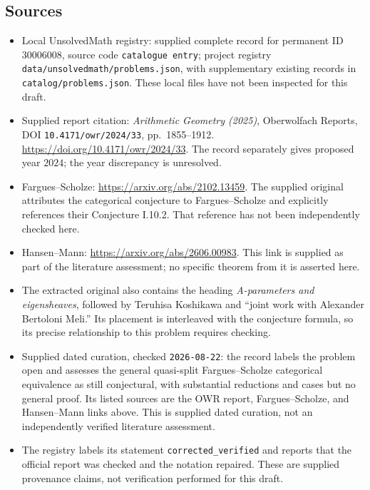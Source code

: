 \documentclass[11pt]{article}
\begin{document}
\subsection{Sources}
\begin{itemize}
\item Local UnsolvedMath registry: supplied complete record for permanent ID \(30006008\), source code \texttt{catalogue entry}; project registry \texttt{data/unsolvedmath/problems.json}, with supplementary existing records in \texttt{catalog/problems.json}. These local files have not been inspected for this draft.
\item Supplied report citation: \emph{Arithmetic Geometry (2025)}, Oberwolfach Reports, DOI \texttt{10.4171/owr/2024/33}, pp.\ 1855--1912. \url{https://doi.org/10.4171/owr/2024/33}. The record separately gives proposed year \(2024\); the year discrepancy is unresolved.
\item Fargues--Scholze: \url{https://arxiv.org/abs/2102.13459}. The supplied original attributes the categorical conjecture to Fargues--Scholze and explicitly references their Conjecture I.10.2. That reference has not been independently checked here.
\item Hansen--Mann: \url{https://arxiv.org/abs/2606.00983}. This link is supplied as part of the literature assessment; no specific theorem from it is asserted here.
\item The extracted original also contains the heading \emph{A-parameters and eigensheaves}, followed by Teruhisa Koshikawa and ``joint work with Alexander Bertoloni Meli.'' Its placement is interleaved with the conjecture formula, so its precise relationship to this problem requires checking.
\item Supplied dated curation, checked \texttt{2026-08-22}: the record labels the problem open and assesses the general quasi-split Fargues--Scholze categorical equivalence as still conjectural, with substantial reductions and cases but no general proof. Its listed sources are the OWR report, Fargues--Scholze, and Hansen--Mann links above. This is supplied dated curation, not an independently verified literature assessment.
\item The registry labels its statement \texttt{corrected\_verified} and reports that the official report was checked and the notation repaired. These are supplied provenance claims, not verification performed for this draft.
\end{itemize}
\end{document}
